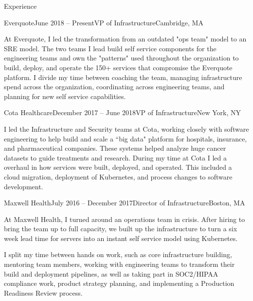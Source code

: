 \documentclass{resume} %
\begin{document}

\begin{rSection}{Experience}
\begin{rSubsection}{Everquote}{June 2018 -- Present}{VP of Infrastructure}{Cambridge, MA}

\item[] At Everquote, I led the transformation from an outdated "ops team" model to an
  SRE model.  The two teams I lead build self service components for the engineering
  teams and own the "patterns" used throughout the organization to build, deploy, and
  operate the 150+ services that compromise the Everquote platform.  I divide my time
  between coaching the team, managing infrastructure spend across the
  organization, coordinating across engineering teams, and planning for new
  self service capabilities.

\end{rSubsection}

\begin{rSubsection}{Cota Healthcare}{December 2017 -- June 2018}{VP of Infrastructure}{New York, NY}
\item[] I led the Infrastructure and Security teams at Cota, working closely with
  software engineering to help build and scale a ``big data" platform for hospitals,
  insurance, and pharmaceutical companies.  These systems helped analyze huge cancer
  datasets to guide treatments and research.  During my time at Cota I led a overhaul
  in how services were built, deployed, and operated.  This included a cloud migration,
  deployment of Kubernetes, and process changes to software development.

\end{rSubsection}

\begin{rSubsection}{Maxwell Health}{July 2016 -- December 2017}{Director of Infrastructure}{Boston, MA}

\item[] At Maxwell Health, I turned around an operations team in crisis.  After
  hiring to bring the team up to full capacity, we built up the infrastructure
  to turn a six week lead time for servers into an instant self service model
  using Kubernetes.

I split my time between hands on work, such as core infrastructure building,
  mentoring team members, working with engineering teams to transform their
  build and deployment pipelines, as well as taking part in SOC2/HIPAA
  compliance work, product strategy planning, and implementing a Production
  Readiness Review process.


\end{rSubsection}
\end{rSection}
\end{document}
